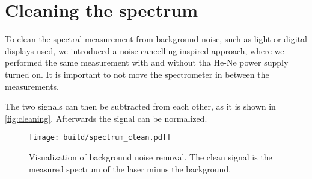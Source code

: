 \section{Cleaning the spectrum}
\label{sec:cleaning}
To clean the spectral measurement from background noise, such as light or digital displays used, we
introduced a noise cancelling inspired approach, where we performed the same measurement with and
without tha He-Ne power supply turned on. It is important to not move the spectrometer in between
the measurements. 

The two signals can then be subtracted from each other, as it is shown in \autoref{fig:cleaning}.
Afterwards the signal can be normalized.
\begin{figure*}
  \centering
  \texttt{[image: build/spectrum\_clean.pdf]}
  \caption{Visualization of background noise removal. The clean signal is the measured spectrum of
  the laser minus the background.}
  \label{fig:cleaning}
\end{figure*}

